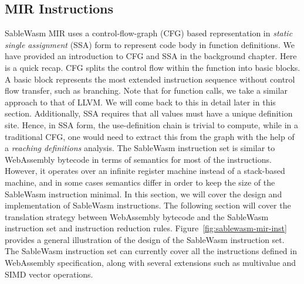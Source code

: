 \subsection{MIR Instructions}

SableWasm MIR uses a control-flow-graph (CFG) based representation in
\emph{static single assignment} (SSA) form to represent code body in function
definitions. We have provided an introduction to CFG and SSA in the background
chapter. Here is a quick recap. CFG splits the control flow within the function
into basic blocks. A basic block represents the most extended instruction
sequence without control flow transfer, such as branching. Note that for
function calls, we take a similar approach to that of LLVM. We will come back
to this in detail later in this section. Additionally, SSA requires that all
values must have a unique definition site. Hence, in SSA form, the
use-definition chain is trivial to compute, while in a traditional CFG, one
would need to extract this from the graph with the help of a \emph{reaching
  definitions} analysis. The SableWasm instruction set is similar to WebAssembly
bytecode in terms of semantics for most of the instructions. However, it
operates over an infinite register machine instead of a stack-based machine, and
in some cases semantics differ in order to keep the size of the SableWasm
instruction minimal. In this section, we will cover the design and
implementation of SableWasm instructions. The following section will cover the
translation strategy between WebAssembly bytecode and the SableWasm instruction
set and instruction reduction rules. Figure~\ref{fig:sablewasm-mir-inst}
provides a general illustration of the design of the SableWasm instruction set.
The SableWasm instruction set can currently cover all the instructions defined
in WebAssembly specification, along with several extensions such as multivalue
and SIMD vector operations.

